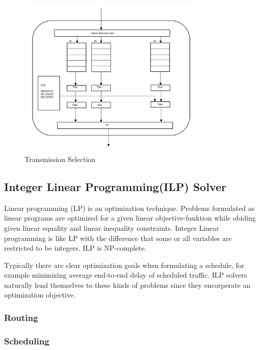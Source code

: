 \documentclass[conference]{IEEEtran}
\begin{document}
\begin{figure}[here]
\includegraphics[width=9cm]{pic/figure_01.png}
\caption{Transmission Selection}
\end{figure}


\subsection{Integer Linear Programming(ILP) Solver}

Linear programming (LP) is an optimization technique. Problems formulated as linear programs are optimized for a given linear objective-funktion while obiding given linear equality and linear inequality constraints. Integer Linear programming is like LP with the difference that some or all variables are restricted to be integers. ILP is NP-complete.

Typically there are clear optimization goals when formulating a schedule, for example minimizing average end-to-end delay of scheduled traffic. ILP solvers naturally lend themselves to these kinds of problems since they encorperate an optimization objective.
\subsubsection{Routing}

\subsubsection{Scheduling}
\end{document}
